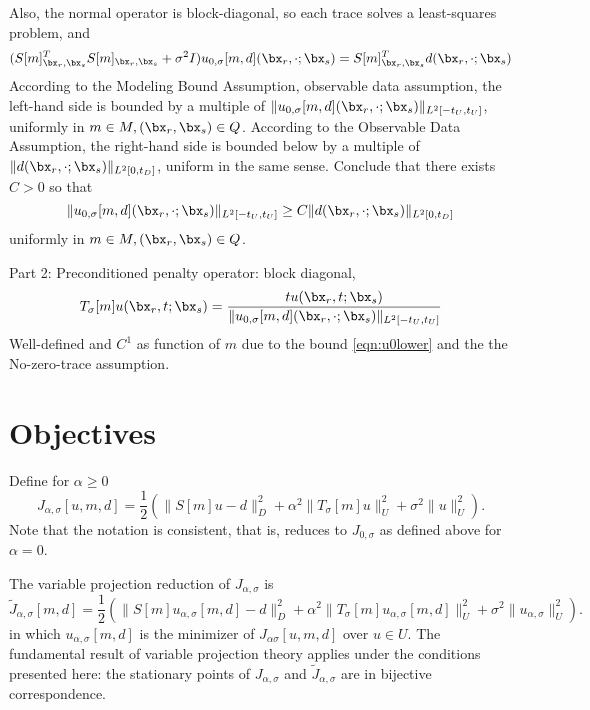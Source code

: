 Also, the normal operator is block-diagonal, so each trace solves a least-squares problem, and
\[
  (S[m]_{\bx_r,\bx_s}^TS[m]_{\bx_r,\bx_s} + \sigma^2 I)u_{0,\sigma}[m,d](\bx_r,\cdot; \bx_s)= S[m]_{\bx_r,\bx_s}^Td(\bx_r,\cdot;\bx_s)
\]
According to the Modeling Bound Assumption, observable data assumption, the left-hand side is bounded by a multiple of $\|u_{0,\sigma}[m,d](\bx_r,\cdot; \bx_s)\|_{L^2[-t_U,t_U]}$, uniformly in $m \in M, (\bx_r,\bx_s) \in Q$. According to the Observable Data Assumption, the right-hand side is bounded below by a multiple of $\|d(\bx_r,\cdot;\bx_s)\|_{L^2[0,t_D]}$, uniform in the same sense. Conclude that there exists $C>0$ so that
\begin{equation}
  \label{eqn:u0lower}
  \|u_{0,\sigma}[m,d](\bx_r,\cdot; \bx_s)\|_{L^2[-t_U,t_U]} \ge C \|d(\bx_r,\cdot;\bx_s)\|_{L^2[0,t_D]}
\end{equation}
uniformly in $m \in M, (\bx_r,\bx_s) \in Q$.

Part 2:
Preconditioned penalty operator: block diagonal, 
\begin{equation}
  \label{eqn:ppf}
  T_{\sigma}[m]u (\bx_r,t;\bx_s) = \frac{t u(\bx_r,t;\bx_s)}{\|u_{0,\sigma}[m,d](\bx_r,\cdot; \bx_s)\|_{L^2[-t_U,t_U]} }
\end{equation}
Well-defined and $C^1$ as function of $m$ due to the bound \ref{eqn:u0lower} and the the No-zero-trace assumption.

\section{Objectives}
Define for $\alpha \ge 0$
\[
 J_{\alpha,\sigma}[u,m,d] = \frac{1}{2}(\|S[m]u - d\|_D^2 + \alpha^2\|T_\sigma[m]u\|_U^2 + \sigma^2 \|u\|^2_U).
\]
Note that the notation is consistent, that is, reduces to $J_{0,\sigma}$ as defined above for $\alpha=0$.

The variable projection reduction of $J_{\alpha,\sigma}$ is
\begin{equation}
  \label{eqn:jtilde}
 \tilde{J}_{\alpha,\sigma}[m,d] = \frac{1}{2}(\|S[m]u_{\alpha,\sigma}[m,d] - d\|_D^2 + \alpha^2\|T_\sigma[m]u_{\alpha,\sigma}[m,d]\|_U^2 + \sigma^2 \|u_{\alpha,\sigma}\|^2_U).
\end{equation}
in which $u_{\alpha,\sigma}[m,d]$ is the minimizer of $J_{\alpha\sigma}[u,m,d]$ over $u \in U$. The fundamental result of variable projection theory \cite[]{GolubPeyreyra:73} applies under the conditions presented here: the stationary points of $J_{\alpha,\sigma}$ and $\tilde{J}_{\alpha,\sigma}$ are in bijective correspondence.

